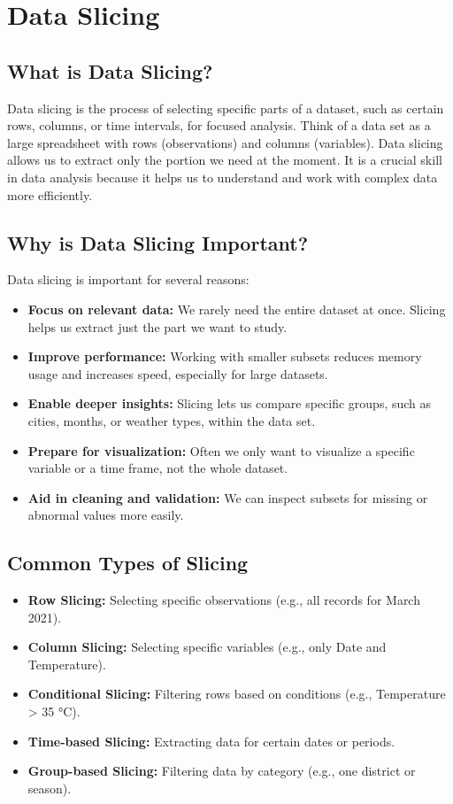 \chapter{Data Slicing}

\section*{What is Data Slicing?}

Data slicing is the process of selecting specific parts of a dataset, such as certain rows, columns, or time intervals, for focused analysis. Think of a data set as a large spreadsheet with rows (observations) and columns (variables). Data slicing allows us to extract only the portion we need at the moment. It is a crucial skill in data analysis because it helps us to understand and work with complex data more efficiently.

\section*{Why is Data Slicing Important?}

Data slicing is important for several reasons:
\begin{itemize}
    \item \textbf{Focus on relevant data:} We rarely need the entire dataset at once. Slicing helps us extract just the part we want to study.
    \item \textbf{Improve performance:} Working with smaller subsets reduces memory usage and increases speed, especially for large datasets.
    \item \textbf{Enable deeper insights:} Slicing lets us compare specific groups, such as cities, months, or weather types, within the data set.
    \item \textbf{Prepare for visualization:} Often we only want to visualize a specific variable or a time frame, not the whole dataset.
    \item \textbf{Aid in cleaning and validation:} We can inspect subsets for missing or abnormal values more easily.
\end{itemize}

\section*{Common Types of Slicing}

\begin{itemize}
    \item \textbf{Row Slicing:} Selecting specific observations (e.g., all records for March 2021).
    \item \textbf{Column Slicing:} Selecting specific variables (e.g., only Date and Temperature).
    \item \textbf{Conditional Slicing:} Filtering rows based on conditions (e.g., Temperature > 35 °C).
    \item \textbf{Time-based Slicing:} Extracting data for certain dates or periods.
    \item \textbf{Group-based Slicing:} Filtering data by category (e.g., one district or season).
\end{itemize}

